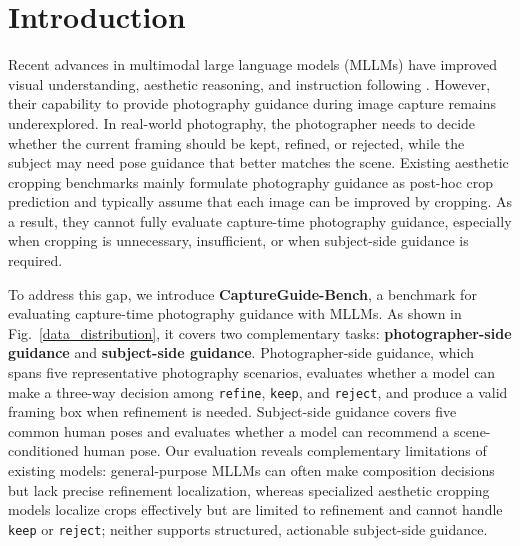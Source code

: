 \documentclass{article} %
\begin{document}
\section{Introduction}
\label{sec:intro}

Recent advances in multimodal large language models (MLLMs) have improved visual understanding, aesthetic reasoning, and instruction following \citep{alayrac2022flamingo,li2023blip,dai2023instructblip,zhu2024minigpt,bai2025qwen3,bai2023qwenvlversatilevisionlanguagemodel,liu2023visual,team2023gemini,wang2025internvl3,huang2024aesexpert,qi2025photographer,wu2023q,liu2025advancing,cao2025artimuse}. However, their capability to provide photography guidance during image capture remains underexplored. In real-world photography, the photographer needs to decide whether the current framing should be kept, refined, or rejected, while the subject may need pose guidance that better matches the scene. Existing aesthetic cropping benchmarks \citep{yan2013learning,hong2024learning,yang2023focusing,zeng2019reliable,wei2018good,chen2017quantitative,fang2014automatic,zhang2022human} mainly formulate photography guidance as post-hoc crop prediction and typically assume that each image can be improved by cropping. As a result, they cannot fully evaluate capture-time photography guidance, especially when cropping is unnecessary, insufficient, or when subject-side guidance is required.

To address this gap, we introduce \textbf{CaptureGuide-Bench}, a benchmark for evaluating capture-time photography guidance with MLLMs. As shown in Fig.~\ref{data_distribution}, it covers two complementary tasks: \textbf{photographer-side guidance} and \textbf{subject-side guidance}. Photographer-side guidance, which spans five representative photography scenarios, evaluates whether a model can make a three-way decision among \texttt{refine}, \texttt{keep}, and \texttt{reject}, and produce a valid framing box when refinement is needed. Subject-side guidance covers five common human poses and evaluates whether a model can recommend a scene-conditioned human pose. Our evaluation reveals complementary limitations of existing models: general-purpose MLLMs \citep{wang2025internvl3,bai2025qwen3,team2023gemini,achiam2023gpt,moonshotai2025kimik26} can often make composition decisions but lack precise refinement localization, whereas specialized aesthetic cropping models \citep{sheng2025instructcrop,du2026venus,hong2021composing,liu2023beyond} localize crops effectively but are limited to refinement and cannot handle \texttt{keep} or \texttt{reject}; neither supports structured, actionable subject-side guidance.
\end{document}

